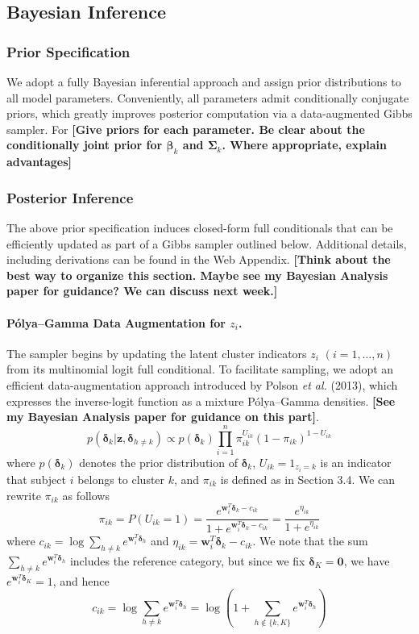 \documentclass[useAMS,referee]{biom}
\begin{document}
\subsection{Bayesian Inference}

\subsubsection{Prior Specification}
We adopt a fully Bayesian inferential approach and assign prior distributions to all model parameters. Conveniently, all parameters admit conditionally conjugate priors, which greatly improves posterior computation via a data-augmented Gibbs sampler. For \textbf{[Give priors for each parameter. Be clear about the conditionally joint prior for $\boldsymbol\beta_k$ and $\boldsymbol\Sigma_k$. Where appropriate, explain advantages]}

\subsubsection{Posterior Inference} 
The above prior specification induces closed-form full conditionals that can be efficiently updated as part of a Gibbs sampler outlined below. Additional details, including derivations can be found in the Web Appendix. \textbf{[Think about the best way to organize this section. Maybe see my Bayesian Analysis paper for guidance? We can discuss next week.]}

\paragraph{P\'olya--Gamma Data Augmentation for $z_i$.} The sampler begins by updating the latent cluster indicators $z_i$ $(i=1,\ldots,n)$ from its multinomial logit full conditional. To facilitate sampling, we adopt an efficient data-augmentation approach introduced by Polson \textit{et al.} (2013), which expresses the inverse-logit function as a mixture P\'olya--Gamma densities. \textbf{[See my Bayesian Analysis paper for guidance on this part]}.
$$p(\boldsymbol\delta_k|\mathbf{z},\boldsymbol\delta_{h \ne k}) \propto p(\boldsymbol\delta_k) \prod_{i = 1}^{n} \pi_{ik}^{U_{ik}}(1-\pi_{ik})^{1-U_{ik}}$$
where $p(\boldsymbol\delta_k)$ denotes the prior distribution of $\boldsymbol\delta_k$, $U_{ik} = {1}_{z_i = k}$ is an indicator that subject $i$ belongs to cluster $k$, and $\pi_{ik}$ is defined as in Section 3.4. We can rewrite $\pi_{ik}$ as follows
$$\pi_{ik} = P(U_{ik} = 1) = \frac{e^{\mathbf{w}_i^T \boldsymbol\delta_k - {c}_{ik}}}{1 + e^{\mathbf{w}_i^T \boldsymbol\delta_k - {c}_{ik}}} = \frac{e^{\eta_{ik}}}{1 + e^{\eta_{ik}}}$$
where ${c}_{ik} = \log \sum_{h \ne k} e^{\mathbf{w}_i^T \boldsymbol\delta_{h}}$ and $\eta_{ik} = \mathbf{w}_i^T \boldsymbol\delta_k - {c}_{ik}$. We note that the sum $\sum_{h \ne k} e^{\mathbf{w}_i^T \boldsymbol\delta_{h}}$ includes the reference category, but since we fix $\boldsymbol\delta_K = \mathbf{0}$, we have $e^{\mathbf{w}_i^T \boldsymbol\delta_K} = 1$, and hence
$$c_{ik} = \log \sum_{h \ne k} e^{\mathbf{w}_i^T \boldsymbol\delta_{h}} = \log \left ( 1 + \sum_{h \notin \{k,K \}} e^{\mathbf{w}_i^T \boldsymbol\delta_{h}} \right )$$
\end{document}

